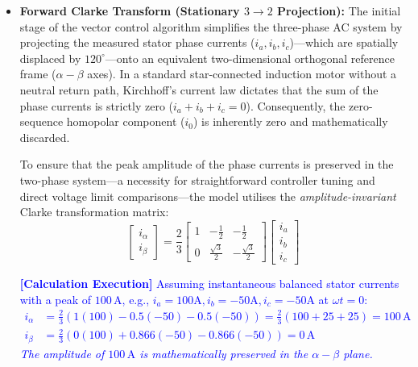 \documentclass[12pt]{article}
\begin{document}
\begin{itemize}
    \item \textbf{Forward Clarke Transform (Stationary $3 \to 2$ Projection):} 
    The initial stage of the vector control algorithm simplifies the three-phase AC system by projecting the measured stator phase currents ($i_a, i_b, i_c$)—which are spatially displaced by $120^\circ$—onto an equivalent two-dimensional orthogonal reference frame ($\alpha-\beta$ axes). In a standard star-connected induction motor without a neutral return path, Kirchhoff's current law dictates that the sum of the phase currents is strictly zero ($i_a + i_b + i_c = 0$). Consequently, the zero-sequence homopolar component ($i_0$) is inherently zero and mathematically discarded. 
    
    To ensure that the peak amplitude of the phase currents is preserved in the two-phase system—a necessity for straightforward controller tuning and direct voltage limit comparisons—the model utilises the \textit{amplitude-invariant} Clarke transformation matrix:
    \begin{equation}
        \begin{bmatrix} i_\alpha \\ i_\beta \end{bmatrix} = 
        \frac{2}{3}
        \begin{bmatrix} 
        1 & -\frac{1}{2} & -\frac{1}{2} \\ 
        0 & \frac{\sqrt{3}}{2} & -\frac{\sqrt{3}}{2} 
        \end{bmatrix}
        \begin{bmatrix} i_a \\ i_b \\ i_c \end{bmatrix}
    \end{equation}

    \textcolor{blue}{\textbf{[Calculation Execution]} Assuming instantaneous balanced stator currents with a peak of $100 \, \text{A}$, e.g., $i_a = 100\text{A}, i_b = -50\text{A}, i_c = -50\text{A}$ at $\omega t = 0$:
    \begin{align*}
        i_\alpha &= \frac{2}{3} \left(1(100) - 0.5(-50) - 0.5(-50)\right) = \frac{2}{3}(100 + 25 + 25) = 100 \, \text{A} \\
        i_\beta &= \frac{2}{3} \left(0(100) + 0.866(-50) - 0.866(-50)\right) = 0 \, \text{A}
    \end{align*}
    \textit{The amplitude of $100 \, \text{A}$ is mathematically preserved in the $\alpha-\beta$ plane.}}


\end{itemize}
\end{document}
